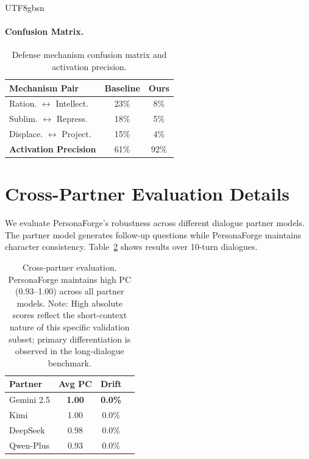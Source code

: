 \documentclass[11pt]{article}
\begin{document}
\begin{CJK*}{UTF8}{gbsn}
\paragraph{Confusion Matrix.}
\begin{table}[h]
\centering
\small
\begin{tabular}{lcc}
\toprule
\textbf{Mechanism Pair} & \textbf{Baseline} & \textbf{Ours} \\
\midrule
Ration. $\leftrightarrow$ Intellect. & 23\% & 8\% \\
Sublim. $\leftrightarrow$ Repress. & 18\% & 5\% \\
Displace. $\leftrightarrow$ Project. & 15\% & 4\% \\
\midrule
\textbf{Activation Precision} & 61\% & 92\% \\
\bottomrule
\end{tabular}
\caption{Defense mechanism confusion matrix and activation precision.}
\label{tab:confusion}
\end{table}

\section{Cross-Partner Evaluation Details}
\label{sec:crosspartner}

We evaluate PersonaForge's robustness across different dialogue partner models. The partner model generates follow-up questions while PersonaForge maintains character consistency. Table~\ref{tab:crosspartner} shows results over 10-turn dialogues.

\begin{table}[h]
\centering
\small
\begin{tabular}{lccc}
\toprule
\textbf{Partner} & \textbf{Avg PC} & \textbf{Drift} \\
\midrule
Gemini 2.5 & \textbf{1.00} & \textbf{0.0\%} \\
Kimi & 1.00 & 0.0\% \\
DeepSeek & 0.98 & 0.0\% \\
Qwen-Plus & 0.93 & 0.0\% \\
\bottomrule
\end{tabular}
\caption{Cross-partner evaluation. PersonaForge maintains high PC (0.93--1.00) across all partner models. Note: High absolute scores reflect the short-context nature of this specific validation subset; primary differentiation is observed in the long-dialogue benchmark.}
\label{tab:crosspartner}
\end{table}



\end{CJK*}
\end{document}
